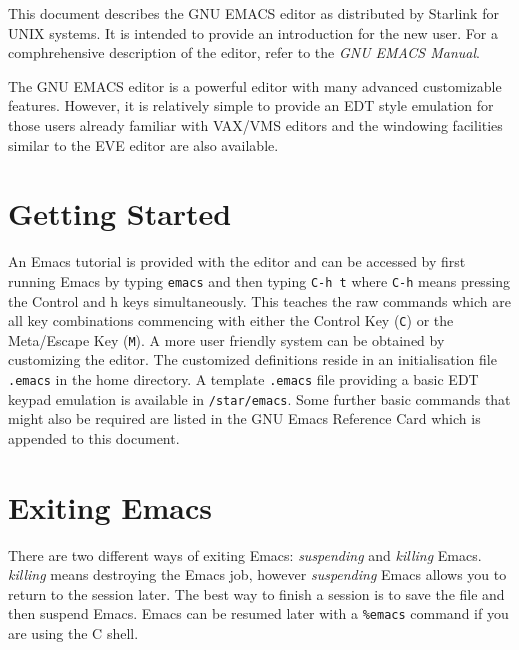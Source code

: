 This document describes the GNU EMACS editor as distributed by Starlink
for UNIX systems. It is intended to provide an introduction for the
new user. For a comphrehensive description of the editor, refer to
the {\it GNU EMACS Manual}.


The GNU EMACS editor is a powerful editor with many advanced customizable
features. 
However, it is relatively simple to provide
an EDT style emulation 
for those users already familiar with VAX/VMS editors and the windowing
facilities similar to the EVE editor are also available.

\section{Getting Started}

An Emacs tutorial is provided with the editor and can be accessed
by first running Emacs by typing {\tt emacs} and then typing {\tt C-h t}
where {\tt C-h} means pressing the Control and h keys simultaneously.
This teaches the raw commands which are all key combinations commencing
with either the Control Key ({\tt C}) or the Meta/Escape Key ({\tt M}).
A more
user friendly system can be obtained by customizing the editor.
The customized definitions reside in an initialisation file {\tt .emacs}
in the home directory. A template {\tt .emacs} file providing
a basic EDT keypad emulation is available in {\tt /star/emacs}.
Some further basic commands that might also be required are listed 
in the GNU Emacs Reference Card which is appended to this document.

\section{Exiting Emacs}

There are two different ways of exiting Emacs: {\it suspending} and
{\it killing} Emacs. {\it killing} means destroying the Emacs job,
however {\it suspending} Emacs allows you to return to the session later.
The best way to finish a session is to save the file and then suspend
Emacs. Emacs can be resumed later with a {\tt \%emacs} command if you are 
using the C shell.


                                                                                                                                           